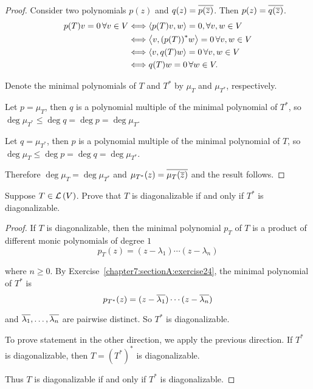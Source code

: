 \begin{proof}
    Consider two polynomials $p(z)$ and $q(z) = \overline{p(\overline{z})}$. Then $p(z) = \overline{q(\overline{z})}$.
    \begin{align*}
        p(T)v = 0\,\forall v\in V & \Longleftrightarrow \left\langle{p(T)v, w}\right\rangle = 0,\forall v, w\in V \\
                                  & \Longleftrightarrow \left\langle{v, {(p(T))}^{*}w}\right\rangle = 0\,\forall v, w\in V \\
                                  & \Longleftrightarrow \left\langle{v, q(T)w}\right\rangle = 0\,\forall v, w\in V \\
                                  & \Longleftrightarrow q(T)w = 0\,\forall w\in V.
    \end{align*}

    Denote the minimal polynomials of $T$ and $T^{*}$ by $\mu_{T}$ and $\mu_{T^{*}}$, respectively.

    Let $p = \mu_{T}$, then $q$ is a polynomial multiple of the minimal polynomial of $T^{*}$, so $\deg \mu_{T^{*}}\leq \deg q = \deg p = \deg \mu_{T}$.

    Let $q = \mu_{T^{*}}$, then $p$ is a polynomial multiple of the minimal polynomial of $T$, so $\deg \mu_{T}\leq \deg p = \deg q = \deg \mu_{T^{*}}$.

    Therefore $\deg \mu_{T} = \deg \mu_{T^{*}}$ and $\mu_{T^{*}}(z) = \overline{\mu_{T}(\overline{z})}$ and the result follows.
\end{proof}
\newpage

\begin{exercise}
    Suppose $T \in \mathcal{L}\left({V}\right)$. Prove that $T$ is diagonalizable if and only if $T^{*}$ is diagonalizable.
\end{exercise}

\begin{proof}
    If $T$ is diagonalizable, then the minimal polynomial $p_{T}$ of $T$ is a product of different monic polynomials of degree $1$
    \[
        p_{T}(z) = (z - \lambda_{1})\cdots (z - \lambda_{n})
    \]

    where $n\geq 0$. By Exercise~\ref{chapter7:sectionA:exercise24}, the minimal polynomial of $T^{*}$ is
    \[
        p_{T^{*}}(z) = (z - \overline{\lambda_{1}})\cdots (z - \overline{\lambda_{n}})
    \]

    and $\overline{\lambda_{1}}, \ldots, \overline{\lambda_{n}}$ are pairwise distinct. So $T^{*}$ is diagonalizable.

    To prove statement in the other direction, we apply the previous direction. If $T^{*}$ is diagonalizable, then $T = {(T^{*})}^{*}$ is diagonalizable.

    Thus $T$ is diagonalizable if and only if $T^{*}$ is diagonalizable.
\end{proof}
\newpage

